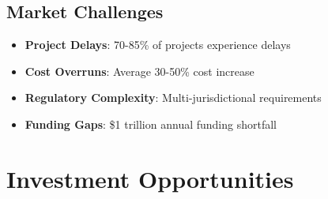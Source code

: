 \documentclass[business]{../templates/infraradar-main}
\begin{document}
\subsection{Market Challenges}
\begin{itemize}
    \item \textbf{Project Delays}: 70-85\% of projects experience delays
    \item \textbf{Cost Overruns}: Average 30-50\% cost increase
    \item \textbf{Regulatory Complexity}: Multi-jurisdictional requirements
    \item \textbf{Funding Gaps}: \$1 trillion annual funding shortfall
\end{itemize}

\section{Investment Opportunities}
\end{document}
